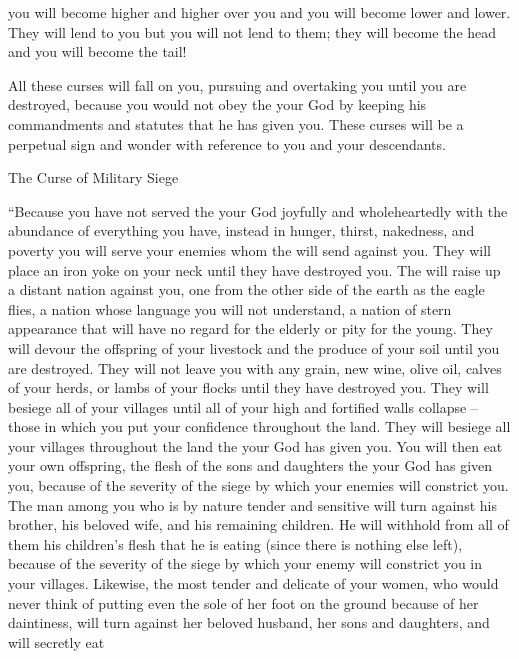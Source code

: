 {you will become higher
and higher
over
you and you
will become lower
and lower.
They will lend
to you
but you will not
lend
to them; they will become
the head
and you
will become
the tail!
\par }{\PP {}All
these
curses
will fall
on
you, pursuing
and overtaking
you until
you are destroyed,
because
you would not
obey
the {}
your God
by keeping
his commandments
and statutes
that
he has given you.
These curses will be
a perpetual
sign
and wonder
with reference
to you and your descendants.
\par }{\SH The Curse of Military Siege
\par }{\PP {}“Because
you have not
served
the {}
your God
joyfully
and wholeheartedly
with the abundance
of everything you have,
instead in hunger,
thirst,
nakedness,
and poverty
you will serve
your enemies
whom
the {}
will send
against you. They will place
an iron
yoke
on
your neck
until
they have destroyed you.
The
{}
will raise
up a distant
nation
against
you, one from the other side of the earth
as
the eagle
flies,
a nation
whose
language
you will not
understand,
a nation
of stern
appearance that
will have no
regard
for the elderly
or
pity
for the young.
They will devour
the offspring
of your livestock
and the produce
of your soil
until
you are destroyed.
They will not
leave
you with any grain,
new wine,
olive oil,
calves of your herds,
or lambs
of your flocks
until
they have destroyed you.
They will besiege
all
of your villages
until
all of your high
and fortified
walls
collapse
– those in which
you
put your confidence
throughout
the land.
They will besiege
all
your villages
throughout
the land
the {}
your God
has
given you.
You will then
eat
your own offspring,
the flesh
of the sons
and daughters
the {}
your God
has
given you, because of the severity
of the siege
by which
your enemies
will constrict you.
The man
among you who is by nature
tender
and sensitive
will turn against
his brother,
his beloved
wife,
and his remaining
children.
He will
withhold
from all
of them
his children’s
flesh
that
he is
eating
(since there is
nothing else left), because of the severity
of the siege
by which
your enemy
will constrict
you in your villages.
Likewise, the most tender
and delicate
of your women, who
would never
think
of putting
even the sole
of her foot
on
the ground
because of her daintiness,
will turn against
her beloved husband,
her sons
and daughters,
and will secretly eat
}
